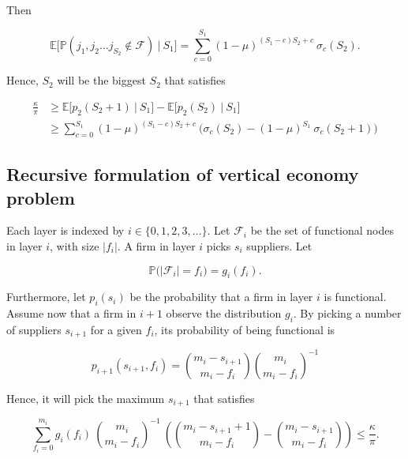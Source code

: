 \documentclass[american, abstract=on]{scrartcl}
\newcommand{\F}{\mathcal{F}}
\renewcommand{\P}{\mathbb{P}}
\newcommand{\E}{\mathbb{E}}
\newcommand{\abs}[1]{\left\lvert#1\right\rvert}
\begin{document}
Then 

\begin{equation}
  \E \Big[ \P\left( j_1, j_2 \ldots j_{S_2} \notin \F \right)\ \vert \ S_1 \Big] = \sum^{S_1}_{c = 0} (1 - \mu)^{(S_1 - c) S_2 + c} \ \sigma_c(S_2).
\end{equation}

Hence, $S_2$ will be the biggest $S_2$ that satisfies 

\begin{equation}
  \begin{split}
    \frac{\kappa}{\pi} &\geq \E \Big[ p_2(S_2 + 1) \ \vert \ S_1 \Big] - \E \Big[ p_2(S_2) \ \vert \ S_1 \Big] \\
    &\geq \sum^{S_1}_{c = 0} (1 - \mu)^{(S_1 - c) S_2 + c} \ \Bigg( \sigma_c(S_2) - (1 - \mu)^{S_1} \ \sigma_c(S_2 + 1) \Bigg)
  \end{split}
\end{equation}


\subsection{Recursive formulation of vertical economy problem}

Each layer is indexed by $i \in \{0, 1, 2, 3, \ldots\}$. Let $\F_i$ be the set of functional nodes in layer $i$, with size $\abs{f_i}$. A firm in layer $i$ picks $s_i$ suppliers. Let 

\begin{equation}
  \P\Big( \abs{\F_i} = f_i \Big) = g_i(f_i).
\end{equation}

Furthermore, let $p_i(s_i)$ be the probability that a firm in layer $i$ is functional. Assume now that a firm in $i+1$ observe the distribution $g_i$. By picking a number of suppliers $s_{i + 1}$ for a given $f_i$, its probability of being functional is

\begin{equation}
  p_{i+1}(s_{i+1}, f_i) = \binom{m_i - s_{i+1}}{m_i - f_i} \binom{m_i}{m_i - f_i}^{-1}
\end{equation}

Hence, it will pick the maximum $s_{i+1}$ that satisfies

\begin{equation}
  \sum^{m_i}_{f_i = 0} g_i(f_i) \ \binom{m_i}{m_i - f_i}^{-1} \ \left( \binom{m_i - s_{i+1} + 1}{m_i - f_i} - \binom{m_i - s_{i+1}}{m_i - f_i} \right) \leq \frac{\kappa}{\pi}.
\end{equation}
\end{document}
